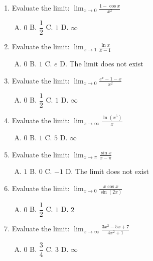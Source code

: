 \documentclass[11pt,a4paper]{article}
\begin{document}
\begin{enumerate}[1.]
    \item Evaluate the limit: $\displaystyle \lim_{x \to 0} \frac{1 - \cos x}{x^2}$
    \begin{enumerate}[A.]
        \item $0$ \qquad B. $\dfrac{1}{2}$ \qquad C. $1$ \qquad D. $\infty$
    \end{enumerate}

    \item Evaluate the limit: $\displaystyle \lim_{x \to 1} \frac{\ln x}{x - 1}$
    \begin{enumerate}[A.]
        \item $0$ \qquad B. $1$ \qquad C. $e$ \qquad D. The limit does not exist
    \end{enumerate}

    \item Evaluate the limit: $\displaystyle \lim_{x \to 0} \frac{e^x - 1 - x}{x^2}$
    \begin{enumerate}[A.]
        \item $0$ \qquad B. $\dfrac{1}{2}$ \qquad C. $1$ \qquad D. $\infty$
    \end{enumerate}

    \item Evaluate the limit: $\displaystyle \lim_{x \to \infty} \frac{\ln(x^5)}{x}$
    \begin{enumerate}[A.]
        \item $0$ \qquad B. $1$ \qquad C. $5$ \qquad D. $\infty$
    \end{enumerate}

    \item Evaluate the limit: $\displaystyle \lim_{x \to \pi} \frac{\sin x}{x - \pi}$
    \begin{enumerate}[A.]
        \item $1$ \qquad B. $0$ \qquad C. $-1$ \qquad D. The limit does not exist
    \end{enumerate}

    \item Evaluate the limit: $\displaystyle \lim_{x \to 0} \frac{x \cos x}{\sin(2x)}$
    \begin{enumerate}[A.]
        \item $0$ \qquad B. $\dfrac{1}{2}$ \qquad C. $1$ \qquad D. $2$
    \end{enumerate}

    \item Evaluate the limit: $\displaystyle \lim_{x \to \infty} \frac{3x^2 - 5x + 7}{4x^2 + 1}$
    \begin{enumerate}[A.]
        \item $0$ \qquad B. $\dfrac{3}{4}$ \qquad C. $3$ \qquad D. $\infty$
    \end{enumerate}

\end{enumerate}
\end{document}

